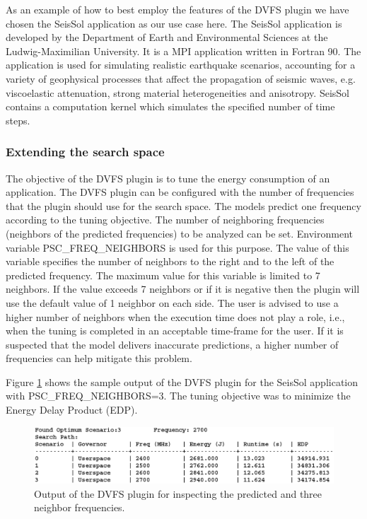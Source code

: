 As an example of how to best employ the features of the DVFS plugin we have chosen the SeisSol application \cite{SeisSol} as our use case here. The SeisSol application is developed by the Department of Earth and Environmental Sciences at the Ludwig-Maximilian University. It is a MPI application written in Fortran 90. The application is used for simulating realistic earthquake scenarios, accounting for a variety of geophysical processes that affect the propagation of seismic waves, e.g. viscoelastic attenuation, strong material heterogeneities and anisotropy. SeisSol contains a computation kernel which simulates the specified number of time steps.

\subsubsection{Extending the search space}

The objective of the DVFS plugin is to tune the energy consumption of an application. The DVFS plugin can be configured with the number of frequencies that the plugin should use for the search space. The models predict one frequency according to the tuning objective. The number of neighboring frequencies (neighbors of the predicted frequencies) to be analyzed can be set. Environment variable PSC\_FREQ\_NEIGHBORS is used for this purpose. The value of this variable specifies the number of neighbors to the right and to the left of the predicted frequency. The maximum value for this variable is limited to 7 neighbors. If the value exceeds 7 neighbors or if it is negative then the plugin will use the default value of 1 neighbor on each side. The user is advised to use a higher number of neighbors when the execution time does not play a role, i.e., when the tuning is completed in an acceptable time-frame for the user. If it is suspected that the model delivers inaccurate predictions, a higher number of frequencies can help mitigate this problem.

Figure \ref{fig:seissol_dvfs_3_nebr} shows the sample output of the DVFS plugin for the SeisSol application with PSC\_FREQ\_NEIGHBORS=3. The tuning objective was to minimize the Energy Delay Product (EDP). 

\begin{figure}[H]
  \centering
  \includegraphics[scale=0.6, width=\textwidth]{../BPG/images/seissol_dvfs_3_nebr.png}
  \caption{Output of the DVFS plugin for inspecting the predicted and three neighbor frequencies.}
  \label{fig:seissol_dvfs_3_nebr}
\end{figure}


